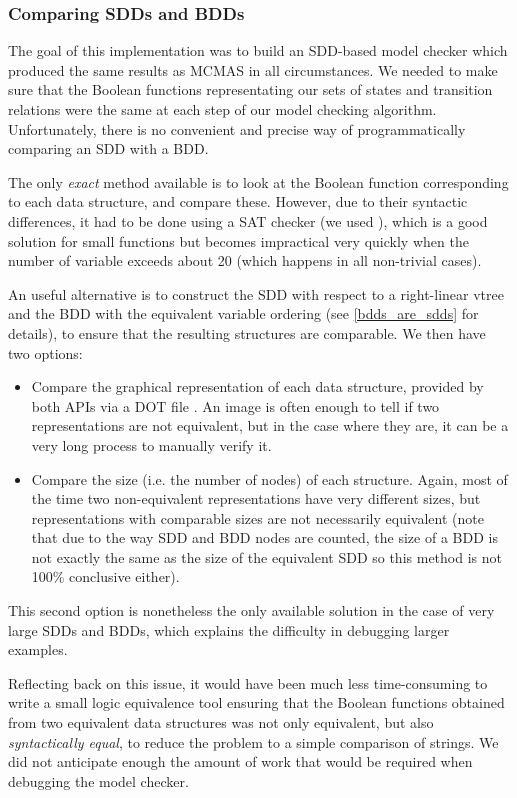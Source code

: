 \documentclass[11pt]{article}
\begin{document}
\subsubsection{Comparing SDDs and BDDs}

The goal of this implementation was to build an SDD-based model checker which produced the same results as MCMAS in all circumstances. We needed to make sure that the Boolean functions representating our sets of states and transition relations were the same at each step of our model checking algorithm. Unfortunately, there is no convenient and precise way of programmatically comparing an SDD with a BDD. 

The only \textit{exact} method available is to look at the Boolean function corresponding to each data structure, and compare these. However, due to their syntactic differences, it had to be done using a SAT checker (we used \cite{minisat}), which is a good solution for small functions but becomes impractical very quickly when the number of variable exceeds about 20 (which happens in all non-trivial cases).  

An useful alternative is to construct the SDD with respect to a right-linear vtree and the BDD with the equivalent variable ordering (see \ref{bdds_are_sdds} for details), to ensure that the resulting structures are comparable. We then have two options:
\begin{itemize}

\item Compare the graphical representation of each data structure, provided by both APIs via a DOT file \cite{dot}. An image is often enough to tell if two representations are not equivalent, but in the case where they are, it can be a very long process to manually verify it.
\item Compare the size (i.e. the number of nodes) of each structure. Again, most of the time two non-equivalent representations have very different sizes, but representations with comparable sizes are not necessarily equivalent (note that due to the way SDD and BDD nodes are counted, the size of a BDD is not exactly the same as the size of the equivalent SDD so this method is not 100\% conclusive either).

\end{itemize}
 This second option is nonetheless the only available solution in the case of very large SDDs and BDDs, which explains the difficulty in debugging larger examples.

Reflecting back on this issue, it would have been much less time-consuming to write a small logic equivalence tool ensuring that the Boolean functions obtained from two equivalent data structures was not only equivalent, but also \textit{syntactically equal}, to reduce the problem to a simple comparison of strings. We did not anticipate enough the amount of work that would be required when debugging the model checker.
\end{document}
